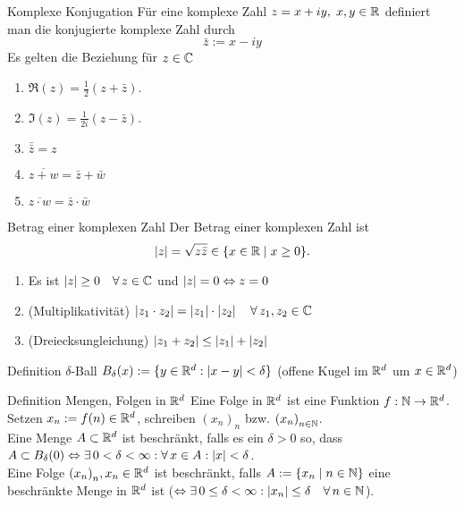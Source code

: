 \documentclass[main.tex]{subfiles}
\begin{document}
\begin{karte}{Komplexe Konjugation}
    Für eine komplexe Zahl 
    \( z=x+iy, \; x,y\in\mathbb{R} \) definiert 
    man die konjugierte komplexe Zahl durch
    \[ \bar{z} := x - iy \]
    Es gelten die Beziehung für \( z\in\mathbb{C} \)
	\begin{enumerate}
		\item \(\Re(z) = \frac{1}{2} (z+\bar{z}). \)
		\item \(\Im(z) = \frac{1}{2i} (z-\bar{z}). \)
		\item \( \bar{\bar{z}} = z \)
		\item \( \overline{z+w} = \bar{z} + \bar{w} \)
		\item \( \overline{z\cdot w} = \bar{z} \cdot \bar{w} \)
    \end{enumerate}
\end{karte}
\begin{karte}{Betrag einer komplexen Zahl}
    Der Betrag einer komplexen Zahl ist
    \[ |z| = \sqrt{z \bar{z}}\in \{x\in\mathbb{R} \;\vert \; x\geq 0\}. \]
    \begin{enumerate}
        \item Es ist \( \abs{z} \geq 0 
        \quad \forall z\in\C \) und 
        \( \left| z \right| = 0 \Leftrightarrow z = 0 \)
        \item (Multiplikativität) 
        \( \abs{z_1 \cdot z_2} 
        = \abs{z_1} \cdot \abs{z_2} 
        \quad \forall z_1,z_2\in\C \)
        \item (Dreiecksungleichung) 
        \( \left| z_1 + z_2 \right| \leq \left| z_1 \right| + \left| z_2 \right| \)
	\end{enumerate}
\end{karte}
\begin{karte}{Definition \( \delta \)-Ball}
    \( B_\delta(x) := \{ y\in\mathbb{R}^d : \left| x-y \right| < \delta \} \) 
    (offene Kugel im \(\mathbb{R}^d\) um \( x\in\mathbb{R}^d \))
\end{karte}
\begin{karte}{Definition Mengen, Folgen in \( \mathbb{R}^d \)}
    Eine Folge in \( \mathbb{R}^d \) ist eine Funktion 
    \( f: \mathbb{N} \rightarrow \mathbb{R}^d \). \\
    Setzen \(x_n := f(n)\in\mathbb{R}^d \), 
    schreiben \( {(x_n)}_n \) bzw. 
    \({(x_n)}_{n\in\mathbb{N}}\).\\
    Eine Menge \( A\subset \mathbb{R}^d \) 
    ist beschränkt, falls es ein 
    \( \delta > 0\) so, dass \( A\subset B_\delta(0) 
    \Leftrightarrow \exists 0<\delta<\infty:
    \forall x\in A: \abs{x} < \delta \).\\
    Eine Folge \( {(x_n)}_n, x_n\in\mathbb{R}^d \) 
    ist beschränkt, falls \(A := \{x_n \;\vert \; n\in\mathbb{N}\} \) 
    eine beschränkte Menge in \( \mathbb{R}^d \) ist 
    (\( \Leftrightarrow \exists 0\leq \delta < \infty: 
    \abs{x_n} \leq \delta \quad \forall n\in\N \)).\\
\end{karte}
\end{document}
